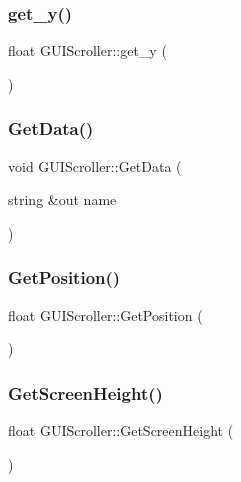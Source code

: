 \hypertarget{class_g_u_i_scroller_a4c9280af256fa20b121bbfa686e1dcc0}{}\label{class_g_u_i_scroller_a4c9280af256fa20b121bbfa686e1dcc0} 
\subsubsection{\texorpdfstring{get\+\_\+y()}{get\_y()}}
{\footnotesize\ttfamily float G\+U\+I\+Scroller\+::get\+\_\+y (\begin{DoxyParamCaption}{ }\end{DoxyParamCaption})}

\hypertarget{class_g_u_i_scroller_af03e01fed089504cf970eeedaceb53c7}{}\label{class_g_u_i_scroller_af03e01fed089504cf970eeedaceb53c7} 
\subsubsection{\texorpdfstring{Get\+Data()}{GetData()}}
{\footnotesize\ttfamily void G\+U\+I\+Scroller\+::\+Get\+Data (\begin{DoxyParamCaption}\item[{string \&out}]{name }\end{DoxyParamCaption})}

\hypertarget{class_g_u_i_scroller_a80f7328b7995d2a9f786a5ffa535f2e1}{}\label{class_g_u_i_scroller_a80f7328b7995d2a9f786a5ffa535f2e1} 
\subsubsection{\texorpdfstring{Get\+Position()}{GetPosition()}}
{\footnotesize\ttfamily float G\+U\+I\+Scroller\+::\+Get\+Position (\begin{DoxyParamCaption}{ }\end{DoxyParamCaption})}

\hypertarget{class_g_u_i_scroller_a1b58f3c2e3cfc08c8cbceb8ce37096ea}{}\label{class_g_u_i_scroller_a1b58f3c2e3cfc08c8cbceb8ce37096ea} 
\subsubsection{\texorpdfstring{Get\+Screen\+Height()}{GetScreenHeight()}}
{\footnotesize\ttfamily float G\+U\+I\+Scroller\+::\+Get\+Screen\+Height (\begin{DoxyParamCaption}{ }\end{DoxyParamCaption})}

